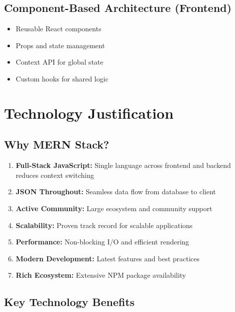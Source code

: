 \subsection{Component-Based Architecture (Frontend)}

\begin{itemize}[leftmargin=*]
    \item Reusable React components
    \item Props and state management
    \item Context API for global state
    \item Custom hooks for shared logic
\end{itemize}

\section{Technology Justification}

\subsection{Why MERN Stack?}

\begin{enumerate}[leftmargin=*]
    \item \textbf{Full-Stack JavaScript:} Single language across frontend and backend reduces context switching
    \item \textbf{JSON Throughout:} Seamless data flow from database to client
    \item \textbf{Active Community:} Large ecosystem and community support
    \item \textbf{Scalability:} Proven track record for scalable applications
    \item \textbf{Performance:} Non-blocking I/O and efficient rendering
    \item \textbf{Modern Development:} Latest features and best practices
    \item \textbf{Rich Ecosystem:} Extensive NPM package availability
\end{enumerate}

\subsection{Key Technology Benefits}

